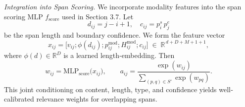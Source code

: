 \medskip
\noindent
\emph{Integration into Span Scoring.}  
We incorporate modality features into the span scoring MLP \(f_{\mathrm{score}}\) used in Section 3.7.  Let
\[
d_{ij} = j - i + 1,\quad
c_{ij} = p^s_i\,p^e_j
\]
be the span length and boundary confidence.  We form the feature vector
\[
x_{ij} = \bigl[
v_{ij};
\phi(d_{ij});
p^{\mathrm{mod}}_{ij};
H^{\mathrm{mod}}_{ij};
c_{ij}
\bigr]\;\in\;\mathbb{R}^{\,d + D + M + 1 + 1},
\]
where \(\phi(d)\in\mathbb{R}^{D}\) is a learned length‐embedding.  Then
\[
w_{ij} = \mathrm{MLP}_{\mathrm{score}}\bigl(x_{ij}\bigr), 
\qquad
a_{ij} = \frac{\exp(w_{ij})}{\sum_{(p,q)\in S'}\exp(w_{pq})}.
\]
This joint conditioning on content, length, type, and confidence yields well‐calibrated relevance weights for overlapping spans.